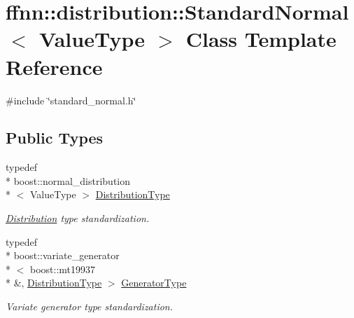 \hypertarget{classffnn_1_1distribution_1_1_standard_normal}{\section{ffnn\-:\-:distribution\-:\-:Standard\-Normal$<$ Value\-Type $>$ Class Template Reference}
\label{classffnn_1_1distribution_1_1_standard_normal}
}


{\ttfamily \#include \char`\"{}standard\-\_\-normal.\-h\char`\"{}}

\subsection*{Public Types}
\begin{DoxyCompactItemize}
\item 
typedef \\*
boost\-::normal\-\_\-distribution\\*
$<$ Value\-Type $>$ \hyperlink{classffnn_1_1distribution_1_1_standard_normal_ac8e48677daf06074050974b825d6ee7a}{Distribution\-Type}
\begin{DoxyCompactList}\small\item\em \hyperlink{classffnn_1_1distribution_1_1_distribution}{Distribution} type standardization. \end{DoxyCompactList}\item 
typedef \\*
boost\-::variate\-\_\-generator\\*
$<$ boost\-::mt19937 \\*
\&, \hyperlink{classffnn_1_1distribution_1_1_standard_normal_ac8e48677daf06074050974b825d6ee7a}{Distribution\-Type} $>$ \hyperlink{classffnn_1_1distribution_1_1_standard_normal_a1313d5da6529fde723b5297f6d2480e9}{Generator\-Type}
\begin{DoxyCompactList}\small\item\em Variate generator type standardization. \end{DoxyCompactList}\end{DoxyCompactItemize}
